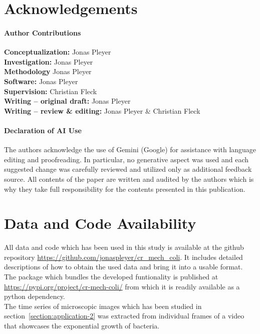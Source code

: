 \newpage
\section*{Acknowledgements}
\paragraph{Author Contributions}
\textbf{Conceptualization:} Jonas Pleyer\\
\textbf{Investigation:} Jonas Pleyer\\
\textbf{Methodology} Jonas Pleyer\\
\textbf{Software:} Jonas Pleyer\\
\textbf{Supervision:} Christian Fleck\\
\textbf{Writing – original draft:} Jonas Pleyer\\
\textbf{Writing – review \& editing:} Jonas Pleyer \& Christian Fleck

\paragraph*{Declaration of AI Use}
The authors acknowledge the use of Gemini (Google) for assistance with language editing and
proofreading.
In particular, no generative aspect was used and each suggested change was carefully
reviewed and
utilized only as additional feedback source.
All contents of the paper are written and audited by the authors which is why they take full
responsibility for the contents presented in this publication.

\section*{Data and Code Availability}
\label{section:data-code-availability}
All data and code which has been used in this study is available at the github repository
\url{https://github.com/jonaspleyer/cr\_mech\_coli}.
It includes detailed descriptions of how to obtain the used data and bring it into a
usable format.
The package which bundles the developed funtionality is published at
\url{https://pypi.org/project/cr-mech-coli/} from which it is readily available as a python
dependency.\\
The time series of microscopic images which has been studied in
section~\ref{section:application-2}
was extracted from individual frames of a video~\cite{Trude1982} that
showcases the exponential growth of bacteria.
